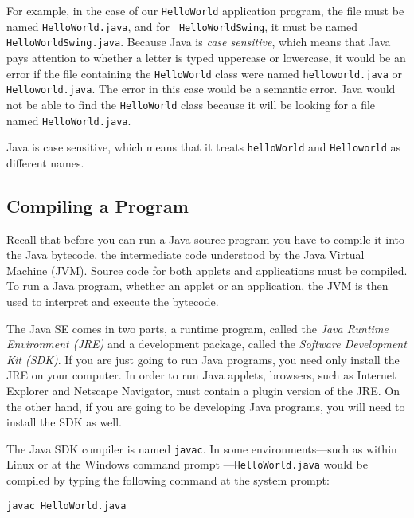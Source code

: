 \noindent For example, in the case of our {\tt HelloWorld} application program, 
the file must be named {\tt HelloWorld.java}, and for {\tt
HelloWorldSwing}, it must be named {\tt HelloWorldSwing.java}.
Because Java is {\em case sensitive}, which means that Java pays
attention to whether a letter is typed uppercase or lowercase, it
would be an error if the file containing the {\tt HelloWorld} class
were named {\tt helloworld.java} or {\tt Helloworld.java}.  The error
in this case would be a semantic error. Java would not be able to find
the {\tt HelloWorld} class because it will be looking for a file named
{\tt HelloWorld.java}.

 {Java is case sensitive,
which means that it treats {\tt helloWorld} and {\tt Helloworld}
as different names.}

\subsection{Compiling a Program}

\noindent Recall that before you can run a Java source program you
have to compile it into the Java  bytecode, the intermediate code
understood by the Java Virtual Machine (JVM).  Source code for both
applets and applications must be compiled.  To run a Java
program, whether an applet or an application, the JVM is then used to
interpret and execute the bytecode.

The Java SE comes in two parts, a runtime program, called the {\it Java
Runtime Environment (JRE)} and a development package, called the {\em
Software Development Kit (SDK)}. If you are just going to run Java
programs, you need only install the JRE on your computer. In order to
run Java applets, browsers, such as Internet Explorer and Netscape
Navigator, must contain a plugin version of the JRE.  On the other
hand, if you are going to be developing Java programs, you will need
to install the SDK as well.

The Java SDK compiler is named {\tt javac}. In some
environments---such as within Linux or at the Windows command prompt
---{\tt HelloWorld.java} would be compiled by typing the
following command at the system prompt:

\begin{jjjlisting}
\begin{lstlisting}
javac HelloWorld.java
\end{lstlisting}
\end{jjjlisting}

